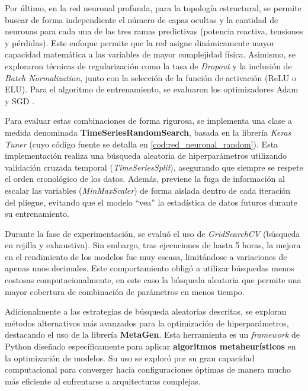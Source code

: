 Por último, en la red neuronal profunda, para la topología estructural, se permite buscar de forma independiente el número de capas ocultas y la cantidad de neuronas para cada una de las tres ramas predictivas (potencia reactiva, tensiones y pérdidas). Este enfoque permite que la red asigne dinámicamente mayor capacidad matemática a las variables de mayor complejidad física. Asimismo, se exploraron técnicas de regularización como la tasa de \textit{Dropout} y la inclusión de \textit{Batch Normalization}, junto con la selección de la función de activación (ReLU o ELU). Para el algoritmo de entrenamiento, se evaluaron los optimizadores Adam y SGD \cite{keras-layers}. 

Para evaluar estas combinaciones de forma rigurosa, se implementa una clase a medida denominada \textbf{TimeSeriesRandomSearch}, basada en la librería \textit{Keras Tuner} (cuyo código fuente se detalla en \ref{cod:red_neuronal_random}). Esta implementación realiza una búsqueda aleatoria de hiperparámetros utilizando validación cruzada temporal (\textit{TimeSeriesSplit}), asegurando que siempre se respete el orden cronológico de los datos. Además, previene la fuga de información al escalar las variables (\textit{MinMaxScaler}) de forma aislada dentro de cada iteración del pliegue, evitando que el modelo ``vea'' la estadística de datos futuros durante su entrenamiento.

Durante la fase de experimentación, se evaluó el uso de \textit{GridSearchCV} (búsqueda en rejilla y exhaustiva). Sin embargo, tras ejecuciones de hasta 5 horas, la mejora en el rendimiento de los modelos fue muy escasa, limitándose a variaciones de apenas unos decimales. Este comportamiento obligó a utilizar búsquedas menos costosas computacionalmente, en este caso la búsqueda aleatoria que permite una mayor cobertura de combinación de parámetros en menos tiempo.

Adicionalmente a las estrategias de búsqueda aleatorias descritas, se exploran métodos alternativos más avanzados para la optimización de hiperparámetros, destacando el uso de la librería \textbf{MetaGen}. Esta herramienta es un \textit{framework} de Python diseñado específicamente para aplicar \textbf{algoritmos metaheurísticos} en la optimización de modelos. Su uso se exploró por su gran capacidad computacional para converger hacia configuraciones óptimas de manera mucho más eficiente al enfrentarse a arquitecturas complejas.